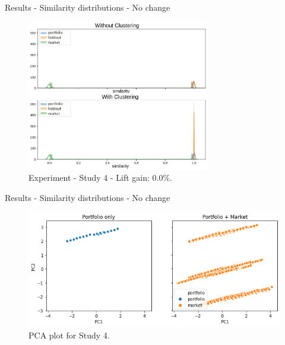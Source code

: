 
\begin{frame}{Results - Similarity distributions - No change}
    \begin{figure}
        \includegraphics[width=8cm]{fig/ch4-study-4-comparsion-exp-ii.png} 
        \caption{Experiment \nameExperimentII{} - Study 4 - Lift gain: \colorbox{white}{0.0\%.}}
    \end{figure}
\end{frame}


\begin{frame}{Results - Similarity distributions - No change}
    \begin{figure}
       \centering
       \includegraphics[width=\linewidth]{fig/ch4-study-4-pca-plot.png}
       \caption{PCA plot for Study 4.}
    \end{figure}
\end{frame}


